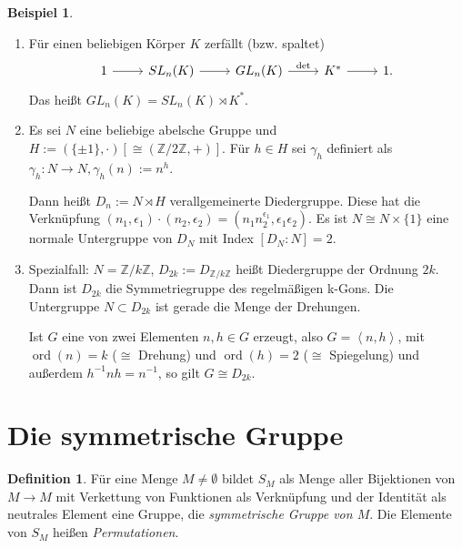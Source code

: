 \documentclass[12pt]{scrartcl}%
\theoremstyle{definition}
\newtheorem*{defn}{Definition}
\newtheorem{ex}{Beispiel}
\theoremstyle{remark}
\DeclareMathOperator\ord{ord}
\begin{document}
\begin{ex}

\begin{enumerate}[label=(\alph*)]
    \item Für einen beliebigen Körper $K$ zerfällt (bzw. spaltet)
    \[ \begin{tikzcd}
         1 \arrow[r] & SL_n(K) \arrow[r] & GL_n(K) \arrow[r,"\det"] & K^* \arrow[r] & 1.
    \end{tikzcd} \]
    Das heißt $GL_n(K) = SL_n(K)\rtimes K^*$.
    
    \item Es sei $N$ eine beliebige abelsche Gruppe und $H := (\{\pm 1\},\cdot)\left[\cong(\mathbb{Z}/2\mathbb{Z},+)\right]$. Für $h\in H$ sei $\gamma_h$ definiert als $\gamma_h:N\to N, \gamma_h(n) := n^h$.
    
    Dann heißt $D_n := N \rtimes H$ verallgemeinerte Diedergruppe. Diese hat die Verknüpfung 
    $(n_1,\epsilon_1)\cdot(n_2,\epsilon_2) = (n_1 n_2^{\epsilon_1},\epsilon_1\epsilon_2)$. Es ist $N \cong N\times\{1\}$ eine normale Untergruppe von $D_N$ mit Index $[D_N:N] = 2$.
    
    \item Spezialfall: $N = \mathbb{Z}/k\mathbb{Z}$, $D_{2k} := D_{\mathbb{Z}/k\mathbb{Z}}$ heißt Diedergruppe der Ordnung $2k$. Dann ist $D_{2k}$ die Symmetriegruppe des regelmäßigen k-Gons. Die Untergruppe $N\subset D_{2k}$ ist gerade die Menge der Drehungen.
    
    Ist $G$ eine von zwei Elementen $n,h\in G$ erzeugt, also $G = \left< n,h\right>$, mit $\ord(n) = k$ ($\cong$ Drehung) und $\ord(h) = 2$ ($\cong$ Spiegelung) und außerdem $h^{-1}nh=n^{-1}$, so gilt $G\cong D_{2k}$.
\end{enumerate}

\end{ex}

\section{Die symmetrische Gruppe}

\begin{defn}
    Für eine Menge $M\neq\emptyset$ bildet $S_M$ als Menge aller Bijektionen von $M\to M$ mit Verkettung von Funktionen als Verknüpfung und der Identität als neutrales Element eine Gruppe, die \emph{symmetrische Gruppe von $M$}. Die Elemente von $S_M$ heißen \emph{Permutationen}.
\end{defn}
\end{document}
